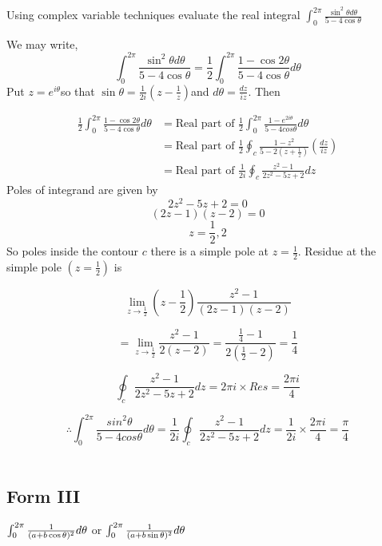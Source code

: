 \begin{example}
Using complex variable techniques evaluate the real integral $\int_{0}^{2\pi}\frac{\sin^{2}\theta d\theta}{5-4\cos\theta}$
\end{example}
\begin{solution}
We may write,\[
\int_{0}^{2\pi}\frac{\sin^{2}\theta d\theta}{5-4\cos\theta}=\frac{1}{2}\int_{0}^{2\pi}\frac{1-\cos2\theta}{5-4\cos\theta}d\theta\]
Put $z=e^{i\theta}$so that $\sin\theta=\frac{1}{2i}\left(z-\frac{1}{z}\right)$and
$d\theta=\frac{dz}{iz}$. Then 

\begin{align*}
\frac{1}{2}\int_{0}^{2\pi}\frac{1-\cos2\theta}{5-4\cos\theta}d\theta & =\text{Real part of }\frac{1}{2}\int_{0}^{2\pi}\frac{1-e^{2i\theta}}{5-4cos\theta}d\theta\\
 & =\text{Real part of }\frac{1}{2}\oint_{c}\frac{1-z^{2}}{5-2(z+\frac{1}{z})}(\frac{dz}{iz})\\
 & =\text{Real part of }\frac{1}{2i}\oint_{c}\frac{z^{2}-1}{2z^{2}-5z+2}dz\end{align*}
Poles of integrand are given by \[
2z^{2}-5z+2=0\]
 \[
(2z-1)(z-2)=0\]
\[
z=\frac{1}{2},2\]
So poles inside the contour $c$ there is a simple pole at $z=\frac{1}{2}$.
Residue at the simple pole $(z=\frac{1}{2})$ is 

\[
\lim_{z\rightarrow\frac{1}{2}}(z-\frac{1}{2})\frac{z^{2}-1}{(2z-1)(z-2)}\]


\[
=\lim_{z\rightarrow\frac{1}{2}}\frac{z^{2}-1}{2(z-2)}=\frac{\frac{1}{4}-1}{2(\frac{1}{2}-2)}=\frac{1}{4}\]


\[
\oint_{c}\frac{z^{2}-1}{2z^{2}-5z+2}dz=2\pi i\times Res=\frac{2\pi i}{4}\]


\[
\therefore\int_{0}^{2\pi}\frac{sin^{2}\theta}{5-4cos\theta}d\theta=\frac{1}{2i}\oint_{c}\frac{z^{2}-1}{2z^{2}-5z+2}dz=\frac{1}{2i}\times\frac{2\pi i}{4}=\frac{\pi}{4}
\]\\
\end{solution}

\subsection{Form III} 
$\int_0^{2\pi} {1 \over (a+b \cos\theta)^2} d\theta$ or $\int_0^{2\pi} {1 \over (a+b \sin\theta)^2} d\theta$

